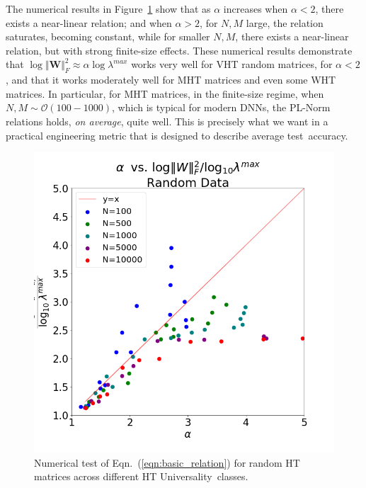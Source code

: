 {The numerical results in Figure~\ref{fig:randW} show that as $\alpha$ increases
when $\alpha<2$, there exists a near-linear relation; and
when $\alpha>2$, for $N,M$ large, the relation saturates, becoming constant, while for smaller $N,M$, there exists a near-linear relation, but with strong finite-size effects.
These numerical results demonstrate that $ \log\Vert\mathbf{W}\Vert^{2}_{F}\approx\alpha\log\lambda^{max} $ works very well for VHT random matrices, for $\alpha<2$, and that it works moderately well for MHT matrices and even some WHT matrices.
In particular, for MHT matrices, in the finite-size regime, when $N,M\sim\mathcal{O}(100-1000)$, which is typical for modern DNNs, the PL-Norm relations holds, \emph{on average}, quite well. 
This is precisely what we want in a practical engineering metric that is designed to describe average test~accuracy. 

\begin{figure}[!htb]
   \centering
   \includegraphics[scale=0.25]{img/Alpha-LogNorm-Relations.png}
   \caption{
            Numerical test of Eqn.~(\ref{eqn:basic_relation}) for random HT matrices across different HT Universality~classes.
           }
   \label{fig:randW}
\end{figure}



}
